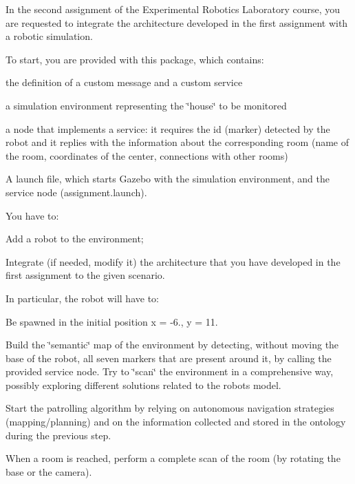 In the second assignment of the Experimental Robotics Laboratory course, you are requested to integrate the architecture developed in the first assignment with a robotic simulation.

To start, you are provided with this package, which contains\+:
\begin{DoxyItemize}
\item the definition of a custom message and a custom service
\item a simulation environment representing the \char`\"{}house\char`\"{} to be monitored
\item a node that implements a service\+: it requires the id (marker) detected by the robot and it replies with the information about the corresponding room (name of the room, coordinates of the center, connections with other rooms)
\item A launch file, which starts Gazebo with the simulation environment, and the service node (assignment.\+launch).
\end{DoxyItemize}

You have to\+:
\begin{DoxyItemize}
\item Add a robot to the environment;
\item Integrate (if needed, modify it) the architecture that you have developed in the first assignment to the given scenario.
\end{DoxyItemize}

In particular, the robot will have to\+:
\begin{DoxyItemize}
\item Be spawned in the initial position x = -\/6., y = 11.
\item Build the \char`\"{}semantic\char`\"{} map of the environment by detecting, without moving the base of the robot, all seven markers that are present around it, by calling the provided service node. Try to \char`\"{}scan\char`\"{} the environment in a comprehensive way, possibly exploring different solutions related to the robot\textquotesingle{}s model.
\item Start the patrolling algorithm by relying on autonomous navigation strategies (mapping/planning) and on the information collected and stored in the ontology during the previous step.
\item When a room is reached, perform a complete scan of the room (by rotating the base or the camera). 
\end{DoxyItemize}